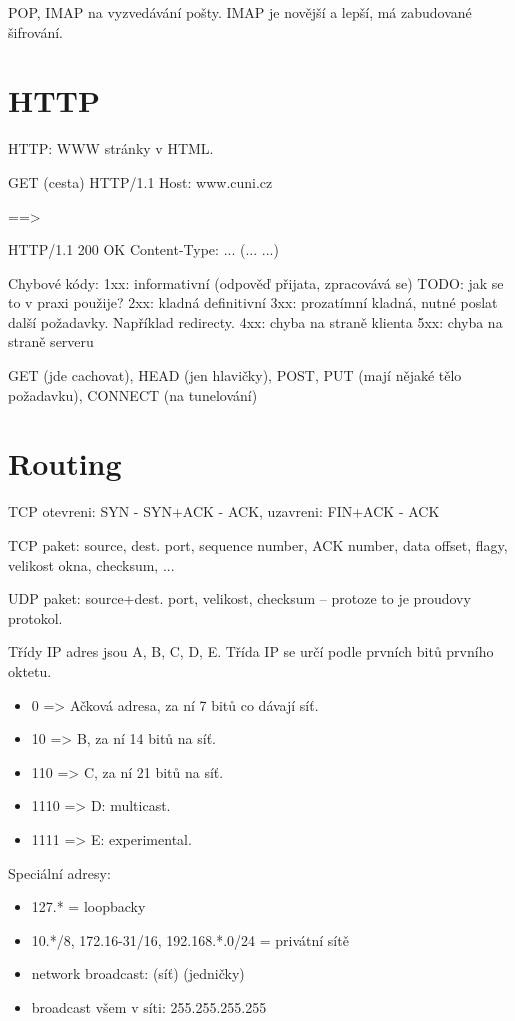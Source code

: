 \documentclass[a4paper,10pt,titlepage]{article} \usepackage[utf8]{inputenc}
\begin{document}
POP, IMAP na vyzvedávání pošty. IMAP je novější a lepší, má zabudované
šifrování.

\section{HTTP}
HTTP: WWW stránky v HTML.

GET (cesta) HTTP/1.1
Host: www.cuni.cz

==>

HTTP/1.1 200 OK
Content-Type: ...
(... ...)

Chybové kódy:
1xx: informativní (odpověď přijata, zpracovává se)
	TODO: jak se to v praxi použije?
2xx: kladná definitivní
3xx: prozatímní kladná, nutné poslat další požadavky. Například redirecty.
4xx: chyba na straně klienta
5xx: chyba na straně serveru

GET (jde cachovat), HEAD (jen hlavičky), POST, PUT (mají nějaké tělo požadavku),
CONNECT (na tunelování)

\section{Routing}
TCP otevreni: SYN - SYN+ACK - ACK, uzavreni: FIN+ACK - ACK

TCP paket: source, dest. port, sequence number, ACK number, data offset, flagy,
velikost okna, checksum, ...

UDP paket: source+dest. port, velikost, checksum -- protoze to je proudovy
protokol.

Třídy IP adres jsou A, B, C, D, E. Třída IP se určí podle prvních bitů prvního
oktetu.
\begin{itemize}
\item 0 => Ačková adresa, za ní 7 bitů co dávají síť.
\item 10 => B, za ní 14 bitů na síť.
\item 110 => C, za ní 21 bitů na síť.
\item 1110 => D: multicast.
\item 1111 => E: experimental.
\end{itemize}

Speciální adresy:
\begin{itemize}
\item 127.* = loopbacky
\item 10.*/8, 172.16-31/16, 192.168.*.0/24 = privátní sítě
\item network broadcast: (síť) (jedničky)
\item broadcast všem v síti: 255.255.255.255
\end{itemize}
\end{document}
